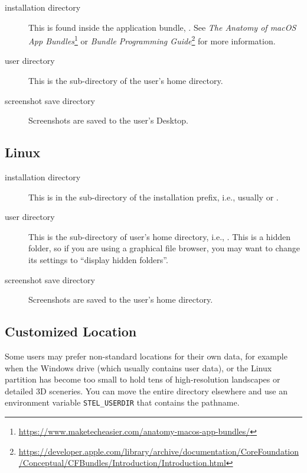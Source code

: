 \begin{description}
\item[installation directory] This is found inside the application
  bundle, . See \emph{The Anatomy of macOS App 
  Bundles}\footnote{\url{https://www.maketecheasier.com/anatomy-macos-app-bundles/}}
  or \emph{Bundle Programming Guide}\footnote{\url{https://developer.apple.com/library/archive/documentation/CoreFoundation/Conceptual/CFBundles/Introduction/Introduction.html}} 
  for more information.
\item[user directory] This is the sub-directory 
   of the user's home
  directory.
\item[screenshot save directory] Screenshots are saved to the user's
  Desktop.
\end{description}

\subsection{Linux}
\label{sec:FilesAndDirectories:Linux}

\begin{description}
\item[installation directory] This is in the
   sub-directory of the installation prefix,
  i.e., usually  or
  .
\item[user directory] This is the  sub-directory of
  user's home directory, i.e.,
  . This is a hidden folder, so
  if you are using a graphical file browser, you may want to change
  its settings to ``display hidden folders''.
\item[screenshot save directory] Screenshots are saved to the user's
  home directory.
\end{description}

\subsection{Customized Location}
\label{sec:FilesAndDirectories:Custom}

Some users may prefer non-standard locations for
their own data, for example when the Windows  drive (which
usually contains user data), or the Linux  partition has
become too small to hold tens of high-resolution landscapes or
detailed 3D sceneries. You can move the entire directory elsewhere and
use an environment variable \texttt{STEL\_USERDIR} that contains the
pathname.

